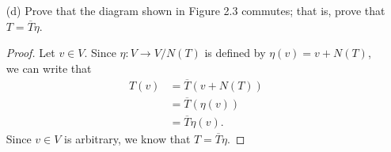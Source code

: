 \begin{enumerate}
\begin{proof}
            Now, we will show that \( \overline{T}  \) is a surjective map. Since \( T  \) is a linear transformation from \( V  \) onto \( Z  \), we know that any arbitrary \( y \in Z  \) can be written as \( T(x) = y  \) for some \( x \in V  \). By definition of \( \overline{T} \), we have
            \[  y = T(x) = \overline{T}(x + N(T)) \] where \( x + N(T) \in V / N(T) \).
            Hence, \( \overline{T} \) is a surjective linear map. Thus, \( \overline{T} \) is an isomorphism.
        \end{proof}
    \item[(d)] Prove that the diagram shown in Figure 2.3 commutes; that is, prove that \( T = \overline{T} \eta \).
        \begin{proof}
        Let \( v \in V  \). Since \( \eta: V \to V / N(T) \) is defined by \( \eta(v) = v + N(T) \), we can write that
        \begin{align*}
            T(v) &= \overline{T}(v + N(T)) \\
                 &= \overline{T}(\eta(v)) \\
                 &= \overline{T}\eta(v).
        \end{align*}
        Since \( v \in V  \) is arbitrary, we know that \( T = \overline{T}\eta \).
        \end{proof}
\end{enumerate}



